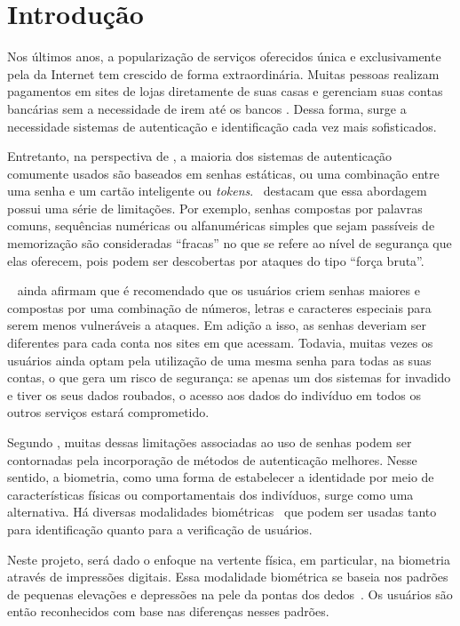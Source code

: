 \section{Introdução}\label{sec:introduacao}

Nos últimos anos, a popularização de serviços oferecidos única e exclusivamente pela da Internet tem crescido de forma extraordinária. Muitas pessoas realizam pagamentos em sites de lojas diretamente de suas casas e gerenciam suas contas bancárias sem a necessidade de irem até os bancos \cite{seguranca_de_dados}. Dessa forma, surge a necessidade sistemas de autenticação e identificação cada vez mais sofisticados.

Entretanto, na perspectiva de , a maioria dos sistemas de autenticação comumente usados são baseados em senhas estáticas, ou uma combinação entre uma senha e um cartão inteligente ou \textit{tokens}.~ destacam que essa abordagem possui uma série de limitações. Por exemplo, senhas compostas por palavras comuns, sequências numéricas ou alfanuméricas simples que sejam passíveis de memorização são consideradas ``fracas'' no que se refere ao nível de segurança que elas oferecem, pois podem ser descobertas por ataques do tipo ``força bruta''.

~ ainda afirmam que é recomendado que os usuários criem senhas maiores e compostas por uma combinação de números, letras e caracteres especiais para serem menos vulneráveis a ataques. Em adição a isso, as senhas deveriam ser diferentes para cada conta nos sites em que acessam. Todavia, muitas vezes os usuários ainda optam pela utilização de uma mesma senha para todas as suas contas, o que gera um risco de segurança: se apenas um dos sistemas for invadido e tiver os seus dados roubados, o acesso aos dados do indivíduo em todos os outros serviços estará comprometido.

Segundo , muitas dessas limitações associadas ao uso de senhas podem ser contornadas pela incorporação de métodos de autenticação melhores. Nesse sentido, a biometria, como uma forma de estabelecer a identidade por meio de características físicas ou comportamentais dos indivíduos, surge como uma alternativa. Há diversas modalidades biométricas~\cite{Jain2016_50Years} que podem ser usadas tanto para identificação quanto para a verificação de usuários.

Neste projeto, será dado o enfoque na vertente física, em particular, na biometria através de impressões digitais. Essa modalidade biométrica se baseia nos padrões de pequenas elevações e depressões na pele da pontas dos dedos~\cite{HandbookOfBiometrics}. Os usuários são então reconhecidos com base nas diferenças nesses padrões.

